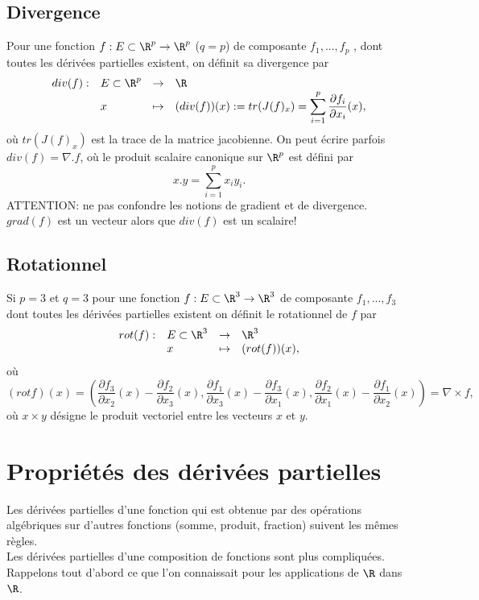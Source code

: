 \documentclass[class=report,crop=false]{standalone}
\begin{document}
  \subsection{Divergence} Pour une fonction  $f: E \subset \R^p \rightarrow \R^p$ ($q=p$)
  de composante $f_1,...,f_p$ , dont toutes les dérivées partielles existent, on d\'efinit sa divergence par
\begin{equation*}
\begin{array}{clll}
    div (f) :& E \subset \R^p & \rightarrow & \R \\
     & x & \mapsto & (div (f))(x):= tr(J(f)_x)=\displaystyle \sum_{i=1}^p \dfrac{\partial f_i}{\partial x_i}(x),
\end{array}
  \end{equation*}
  o\`u $tr(J(f)_x)$ est la trace de la matrice jacobienne. On peut \'ecrire parfois $div(f)=\nabla . f$, o\`u le produit scalaire canonique sur $\R^p$ est d\'efini par
  \begin{equation*}
    x.y=\displaystyle \sum_{i=1}^p x_iy_i.
  \end{equation*}
  \noindent  ATTENTION: ne pas confondre les notions de gradient et de divergence. $grad(f)$
  est un vecteur alors que $div(f)$ est un scalaire!

     \subsection{Rotationnel}
  \noindent Si $p=3$ et $q=3$ pour une fonction  $f: E \subset \R^3 \rightarrow \R^3$
  de composante $f_1,...,f_3$ dont toutes les dérivées partielles existent on d\'efinit le rotationnel de $f$ par
\begin{equation*}
\begin{array}{clll}
    rot (f) :& E \subset \R^3 & \rightarrow & \R^3 \\
     & x & \mapsto & (rot (f))(x),
\end{array}
  \end{equation*}
  o\`u
  \begin{equation*}
    (rot f)(x)=\left(\dfrac{\partial f_3}{\partial x_2}(x)-\dfrac{\partial f_2}{\partial x_3}(x),
    \dfrac{\partial f_1}{\partial x_3}(x)-\dfrac{\partial f_3}{\partial x_1}(x),
    \dfrac{\partial f_2}{\partial x_1}(x)-\dfrac{\partial f_1}{\partial x_2}(x)\right)= \nabla \times f,
  \end{equation*}
  où $x \times y$ désigne le produit vectoriel entre les vecteurs $x$ et $y$.
\section{Propriétés des dérivées partielles}\noindent Les dérivées partielles d'une fonction qui est obtenue par des opérations algébriques sur d'autres fonctions 
(somme, produit, fraction) suivent les mêmes règles.\\
Les dérivées partielles d'une composition de fonctions sont plus compliquées. Rappelons tout d'abord ce que l'on connaissait pour les applications de $\R$ dans $\R$.
\end{document}
